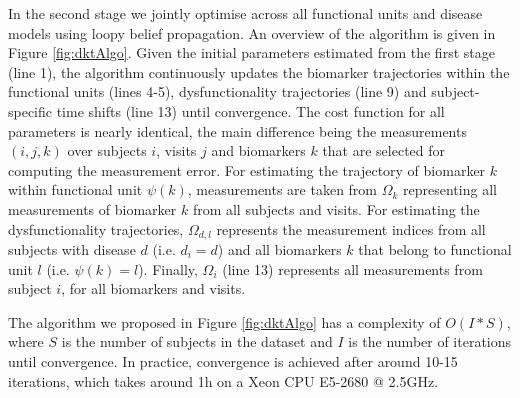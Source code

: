 In the second stage we jointly optimise across all functional units and disease models using loopy belief propagation. An overview of the algorithm is given in Figure \ref{fig:dktAlgo}. Given the initial parameters estimated from the first stage (line 1), the algorithm continuously updates the biomarker trajectories within the functional units (lines 4-5), dysfunctionality trajectories (line 9) and subject-specific time shifts (line 13) until convergence. The cost function for all parameters is nearly identical, the main difference being the measurements $(i,j,k)$ over subjects $i$, visits $j$ and biomarkers $k$ that are selected for computing the measurement error. For estimating the trajectory of biomarker $k$ within functional unit $\psi(k)$, measurements are taken from $\Omega_k$ representing all measurements of biomarker $k$ from all subjects and visits. For estimating the dysfunctionality trajectories,  $\Omega_{d,l}$ represents the measurement indices from all subjects with disease $d$ (i.e. $d_i = d$) and all biomarkers $k$ that belong to functional unit $l$ (i.e. $\psi(k) = l$). Finally, $\Omega_i$ (line 13) represents all measurements from subject $i$, for all biomarkers and visits. 

The algorithm we proposed in Figure \ref{fig:dktAlgo} has a complexity of $O(I*S)$, where $S$ is the number of subjects in the dataset and $I$ is the number of iterations until convergence. In practice, convergence is achieved after around 10-15 iterations, which takes around 1h on a Xeon CPU E5-2680 @ 2.5GHz.


